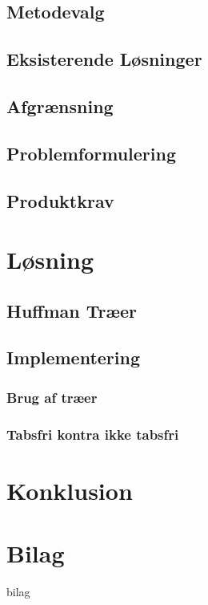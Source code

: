 \documentclass[12pt]{report}
\begin{document}
	\section{Metodevalg}
	

	\section{Eksisterende Løsninger}
	

	\section{Afgrænsning}
	

	\section{Problemformulering}
		
	
	\section{Produktkrav}
	
	



\chapter{Løsning}

	\section{Huffman Træer}
	

	\section{Implementering}
	
	\subsection{Brug af træer}
	   
   
	\subsection{Tabsfri kontra ikke tabsfri}
	

\chapter{Konklusion}






\chapter*{Bilag}
 {bilag}
\end{document}
